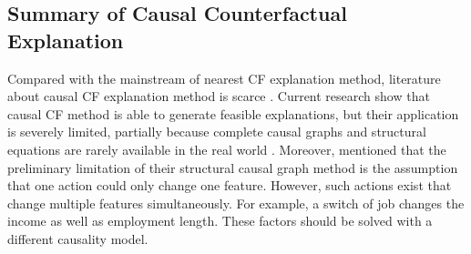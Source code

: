 \subsection{Summary of Causal Counterfactual Explanation}
Compared with the mainstream of nearest CF explanation method, literature about causal CF explanation method is scarce \cite{algorithmicrecourse}. Current research show that causal CF method is able to generate feasible explanations, but their application is severely limited, partially because complete causal graphs and structural equations are rarely available in the real world \cite{CFReview}. Moreover, \citeauthor{algorithmicrecourse} \cite{algorithmicrecourse} mentioned that the preliminary limitation of their structural causal graph method is the assumption that one action could only change one feature. However, such actions exist that change multiple features simultaneously. For example, a switch of job changes the income as well as employment length. These factors should be solved with a different causality model.    